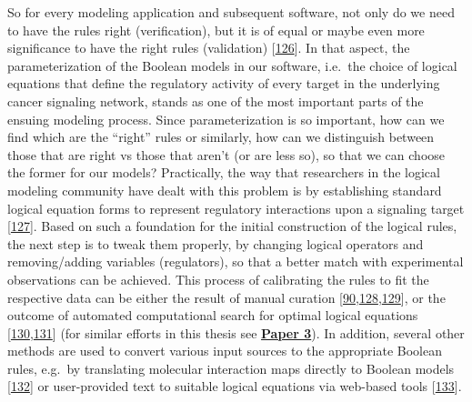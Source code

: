 \documentclass[
  12pt,
]{book}
\begin{document}
So for every modeling application and subsequent software, not only do we need to have the rules right (verification), but it is of equal or maybe even more significance to have the right rules (validation) {[}\protect\hyperlink{ref-Roache1997}{126}{]}.
In that aspect, the parameterization of the Boolean models in our software, i.e.~the choice of logical equations that define the regulatory activity of every target in the underlying cancer signaling network, stands as one of the most important parts of the ensuing modeling process.
Since parameterization is so important, how can we find which are the ``right'' rules or similarly, how can we distinguish between those that are right vs those that aren't (or are less so), so that we can choose the former for our models?
Practically, the way that researchers in the logical modeling community have dealt with this problem is by establishing standard logical equation forms to represent regulatory interactions upon a signaling target {[}\protect\hyperlink{ref-Mendoza2006}{127}{]}.
Based on such a foundation for the initial construction of the logical rules, the next step is to tweak them properly, by changing logical operators and removing/adding variables (regulators), so that a better match with experimental observations can be achieved.
This process of calibrating the rules to fit the respective data can be either the result of manual curation {[}\protect\hyperlink{ref-Flobak2015}{90},\protect\hyperlink{ref-Faure2009}{128},\protect\hyperlink{ref-Niederdorfer2020}{129}{]}, or the outcome of automated computational search for optimal logical equations {[}\protect\hyperlink{ref-Videla2016}{130},\protect\hyperlink{ref-Gjerga2020}{131}{]} (for similar efforts in this thesis see \textbf{\protect\hyperlink{Paper3}{Paper 3}}).
In addition, several other methods are used to convert various input sources to the appropriate Boolean rules, e.g.~by translating molecular interaction maps directly to Boolean models {[}\protect\hyperlink{ref-Aghamiri2020}{132}{]} or user-provided text to suitable logical equations via web-based tools {[}\protect\hyperlink{ref-Helikar2012}{133}{]}.
\end{document}
